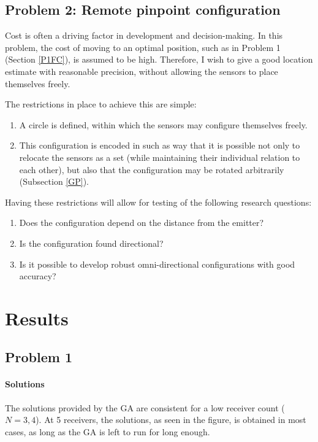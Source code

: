 \documentclass[10pt,a4paper]{book}
\begin{document}
\newpage

\subsection{Problem 2: Remote pinpoint configuration}
\label{P2RPC}
Cost is often a driving factor in development and decision-making. In this problem, the cost of moving to an optimal position, such as in Problem 1 (Section \ref{P1FC}), is assumed to be high. Therefore, I wish to give a good location estimate with reasonable precision, without allowing the sensors to place themselves freely. 

The restrictions in place to achieve this are simple:
\begin{enumerate}
\item A circle is defined, within which the sensors may configure themselves freely.
\item This configuration is encoded in such as way that it is possible not only to relocate the sensors as a set (while maintaining their individual relation to each other), but also that the configuration may be rotated arbitrarily (Subsection \ref{GP}).
\end{enumerate}

Having these restrictions will allow for testing of the following research questions:

\begin{enumerate}
\item Does the configuration depend on the distance from the emitter?
\item Is the configuration found directional?
\item Is it possible to develop robust omni-directional configurations with good accuracy?
\end{enumerate}




\newpage

\section{Results}


\subsection{Problem 1}
\label{RP1}
\paragraph{Solutions}
\label{RP1SOS}
The solutions provided by the \gls{GA} are consistent for a low receiver count ($N = 3,4$). At 5 receivers, the solutions, as seen in the figure, is obtained in most cases,  as long as the \gls{GA} is left to run for long enough.
\end{document}
